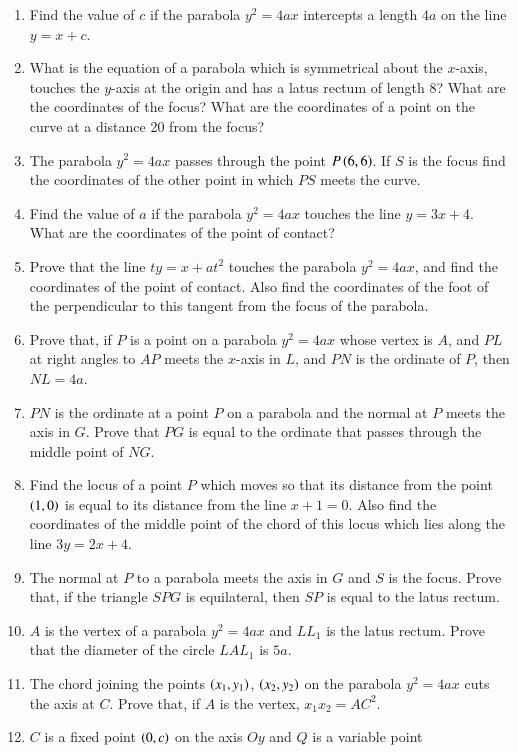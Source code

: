 \begin{enumerate}[1.]
\item Find the value of $c$ if the parabola $y^2=4ax$ intercepts
a length $4a$ on the line $y = x+c$.
\item What is the equation of a parabola which is symmetrical
about the $x$-axis, touches the $y$-axis at the origin and has a latus
rectum of length 8?  What are the coordinates of the focus?   What are the coordinates of a
point on the curve at a distance 20 from the focus?
\item The parabola $y^2=4ax$ passes through the point $P \left(6,6\right)$.  If $S$
is the focus find the coordinates of the other point in which $PS$ meets the curve.
\item Find the value of $a$ if the parabola $y^2=4ax$ touches the line $y = 3x+4$.  
What are the coordinates of the point of contact?
\item Prove that the line $ty=x+at^2$ touches the parabola $y^2=4ax$, and find
the coordinates of the point of contact.  Also find the coordinates of the foot of the
perpendicular to this tangent from the focus of the parabola.
\item  Prove that, if $P$ is a point on a parabola $y^2=4ax$ whose vertex
is $A$, and $PL$ at right angles to $AP$ meets the $x$-axis in $L$,  and $PN$
is the ordinate of $P$, then $NL=4a$.
\item $PN$ is the ordinate at a point $P$ on a parabola and the normal at $P$ meets
the axis in $G$.  Prove that $PG$ is equal to the ordinate that passes through the middle
point of $NG$.  
\item Find the locus of a point $P$ which moves so that its distance from the point
$\left(1,0\right)$ is equal to its distance from the line $x+1=0$.  Also find the coordinates
of the middle point of the chord of this locus which lies along the line $3y=2x+4$.  
\item The normal at $P$ to a parabola meets the axis in $G$ and $S$ is the focus.  Prove that,
if the triangle $SPG$ is equilateral, then $SP$ is equal to the latus rectum.
\item $A$ is the vertex of a parabola $y^2=4ax$ and $LL_1$ is the latus rectum.
Prove that the diameter of the circle $LAL_1$ is $5a$.
\item The chord joining the points $\left(x_1,y_1\right)$, $\left(x_2,y_2\right)$ on the parabola
$y^2=4ax$ cuts the axis at $C$.  Prove that, if $A$ is the vertex, $x_1x_2 = AC^2$.  
\item $C$ is a fixed point $\left(0,c\right)$ on the axis $Oy$ and $Q$ is a variable point

\end{enumerate}
